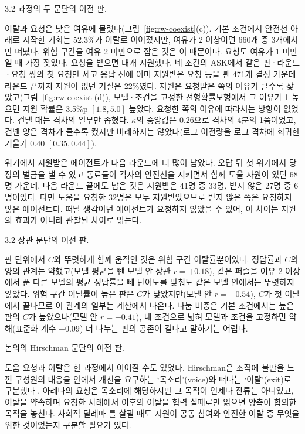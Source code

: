 3.2 과정의 두 문단의 이전 판.

{\color{black}이탈과 요청은 낮은 여유에 몰렸다(그림~\ref{fig:rw-coexist}(c)). 기본 조건에서 안전선 아래로 시작한 기회는 52.3\%가 이탈로 이어졌지만, 여유가 2 이상이면 660개 중 3개에서만 떠났다. 위험 구간을 여유 2 미만으로 잡은 것은 이 때문이다. 요청도 여유가 1 미만일 때 가장 잦았다. 요청을 받으면 대개 지원했다. 네 조건의 ASK에서 같은 판·라운드·요청 쌍의 첫 요청만 세고 응답 전에 이미 지원받은 요청 등을 뺀 471개 결정 가운데 라운드 끝까지 지원이 없던 거절은 22\%였다. 지원은 요청받은 쪽의 여유가 클수록 잦았고(그림~\ref{fig:rw-coexist}(d)), 모델·조건을 고정한 선형확률모형에서 그 여유가 1 높으면 지원 확률은 3.5\%p $[1.8,5.0]$ 높았다. 요청한 쪽의 여유에 따라서는 방향이 없었다. 건넬 때는 격차의 일부만 좁혔다. $\kappa$의 중앙값은 0.26으로 격차의 4분의 1쯤이었고, 건넨 양은 격차가 클수록 컸지만 비례하지는 않았다(로그 이전량을 로그 격차에 회귀한 기울기 0.40 $[0.35,0.44]$).}

{\color{black}위기에서 지원받은 에이전트가 다음 라운드에 더 많이 남았다. 오답 뒤 첫 위기에서 당장의 벌금을 낼 수 있고 동료들이 각자의 안전선을 지키면서 함께 도울 자원이 있던 68명 가운데, 다음 라운드 끝에도 남은 것은 지원받은 41명 중 33명, 받지 않은 27명 중 6명이었다. 다만 도움을 요청한 32명은 모두 지원받았으므로 받지 않은 쪽은 요청하지 않은 에이전트다. 떠날 생각이던 에이전트가 요청하지 않았을 수 있어, 이 차이는 지원의 효과가 아니라 관찰된 차이로 읽는다.}

3.2 상관 문단의 이전 판.

{\color{black}판 단위에서 $C$와 뚜렷하게 함께 움직인 것은 위험 구간 이탈률뿐이었다. 정답률과 $C$의 양의 관계는 약했고(모델 평균을 뺀 모델 안 상관 $r=+0.18$), 같은 퍼즐을 여유 2 이상에서 푼 다른 모델의 평균 정답률을 빼 난이도를 맞춰도 같은 모델 안에서는 뚜렷하지 않았다. 위험 구간 이탈률이 높은 판은 $C$가 낮았지만(모델 안 $r=-0.54$), $C$가 첫 이탈에서 끝나므로 이 관계의 일부는 계산에서 나온다. 나눔 비중은 기본 조건에서는 높은 판의 $C$가 높았으나(모델 안 $r=+0.41$), 네 조건으로 넓혀 모델과 조건을 고정하면 약해(표준화 계수 $+0.09$) 더 나누는 판의 공존이 길다고 말하기는 어렵다.}

논의의 Hirschman 문단의 이전 판.

{\color{black}도움 요청과 이탈은 한 과정에서 이어질 수도 있었다. Hirschman은 조직에 불만을 느낀 구성원의 대응을 안에서 개선을 요구하는 `목소리'(voice)와 떠나는 `이탈'(exit)로 구분했다 \citep{hirschman1970exit}. 아레나의 요청은 목소리에 해당하지만 그 목적이 언제나 잔류는 아니었고, 이탈을 약속하며 요청한 사례에서 이후의 이탈을 협력 실패로만 읽으면 양측이 합의한 목적을 놓친다. 사회적 딜레마 \citep{dawes1980social}를 살필 때도 지원이 공동 참여와 안전한 이탈 중 무엇을 위한 것이었는지 구분할 필요가 있다.}

